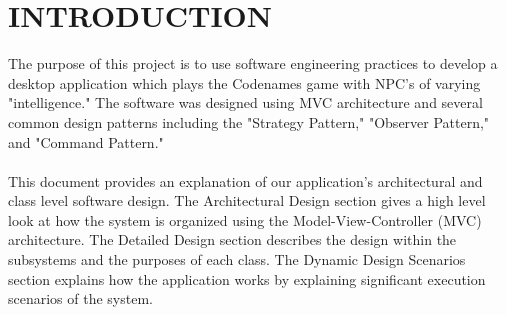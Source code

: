 
\section{INTRODUCTION}

The purpose of this project is to use software engineering practices to develop a desktop application which plays the Codenames game with NPC's of varying "intelligence." The software was designed using MVC architecture and several common design patterns including the "Strategy Pattern," "Observer Pattern," and "Command Pattern."
\\
\\
This document provides an explanation of our application's architectural and class level software design. The Architectural Design section gives a high level look at how the system is organized using the Model-View-Controller (MVC) architecture. The Detailed Design section describes the design within the subsystems and the purposes of each class. The Dynamic Design Scenarios section explains how the application works by explaining significant execution scenarios of the system.
\\
\\
\newpage